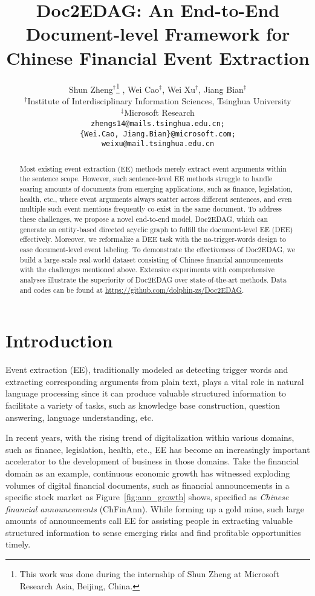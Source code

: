 \documentclass[11pt,a4paper]{article}
\title{Doc2EDAG: An End-to-End Document-level Framework for \\
Chinese Financial Event Extraction}
\author{
Shun Zheng$^\dagger$\thanks{This work was done during the internship of Shun Zheng at Microsoft Research Asia, Beijing, China.} ,
Wei Cao$^\ddagger$,
Wei Xu$^\dagger$,
Jiang Bian$^\ddagger$ \\
$^\dagger$Institute of Interdisciplinary Information Sciences, Tsinghua University\\
$^\ddagger$Microsoft Research\\
{\tt zhengs14@mails.tsinghua.edu.cn;} \\
{\tt \{Wei.Cao, Jiang.Bian\}@microsoft.com;}\\
{\tt weixu@mail.tsinghua.edu.cn}
}
\date{}
\begin{document}
\maketitle

\begin{abstract}
Most existing event extraction (EE) methods merely extract event arguments within the sentence scope. However, such sentence-level EE methods struggle to handle soaring amounts of documents from emerging applications, such as finance, legislation, health, etc., where event arguments always scatter across different sentences, and even multiple such event mentions frequently co-exist in the same document. To address these challenges, we propose a novel end-to-end model, Doc2EDAG, which can generate an entity-based directed acyclic graph to fulfill the document-level EE (DEE) effectively. Moreover, we reformalize a DEE task with the no-trigger-words design to ease document-level event labeling. To demonstrate the effectiveness of Doc2EDAG, we build a large-scale real-world dataset consisting of Chinese financial announcements with the challenges mentioned above. Extensive experiments with comprehensive analyses illustrate the superiority of Doc2EDAG over state-of-the-art methods.
Data and codes can be found at \url{https://github.com/dolphin-zs/Doc2EDAG}.
\end{abstract}

\section{Introduction}

Event extraction (EE), traditionally modeled as detecting trigger words and extracting corresponding arguments from plain text, plays a vital role in natural language processing since it can produce valuable structured information to facilitate a variety of tasks, such as knowledge base construction, question answering, language understanding, etc.

In recent years, with the rising trend of digitalization within various domains, such as finance, legislation, health, etc., EE has become an increasingly important accelerator to the development of business in those domains.  
Take the financial domain as an example, continuous economic growth has witnessed exploding volumes of digital financial documents, such as financial announcements in a specific stock market as Figure~\ref{fig:ann_growth} shows, specified as \textit{Chinese financial announcements} (ChFinAnn).
While forming up a gold mine, such large amounts of announcements call EE for assisting people in extracting valuable structured information to sense emerging risks and find profitable opportunities timely.
\end{document}

